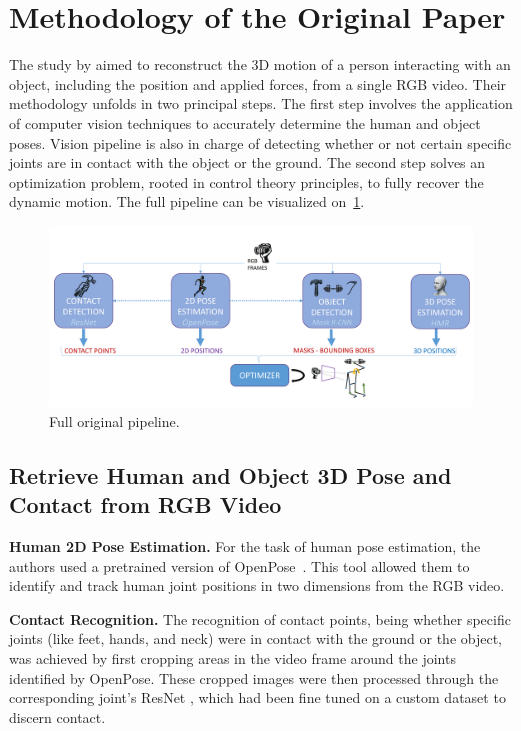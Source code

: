 \section{Methodology of the Original Paper}
\label{sec:methodo_paper}

The study by \citet{li2019estimating} aimed to reconstruct the 3D motion of a person interacting with an object, including the position 
and applied forces, from a single RGB video. Their methodology unfolds in two principal steps. The first step involves the application of 
computer vision techniques to accurately determine the human and object poses. 
Vision pipeline is also in charge of detecting whether or not certain specific joints are in contact with the object or the ground.
The second step solves an optimization problem, rooted in control theory principles, to fully recover the dynamic motion. 
The full pipeline can be visualized on~\cref{fig:original_pipeline}.


\begin{figure}
    \centering
    \includegraphics[width=12cm]{figures/authors_original_pipeline.png}
    \caption{Full original pipeline.}
    \label{fig:original_pipeline}
\end{figure}



\subsection{Retrieve Human and Object 3D Pose and Contact from RGB Video}
\label{subsec:retrieve_original}



\noindent\textbf{Human 2D Pose Estimation.}\label{2dpose} For the task of human pose estimation, the authors used a pretrained version of 
OpenPose~\cite{cao2017realtime}. This tool allowed them to identify and track human joint positions in two dimensions from the RGB video.

\noindent\textbf{Contact Recognition.} The recognition of contact points, being whether specific joints (like feet, hands, and neck) were in 
contact with the ground or the object, was achieved by first cropping areas in the video frame around the joints identified by OpenPose. 
These cropped images were then processed through the corresponding joint's ResNet \cite{he2016deep}, which had been fine tuned on a custom dataset 
to discern contact.


